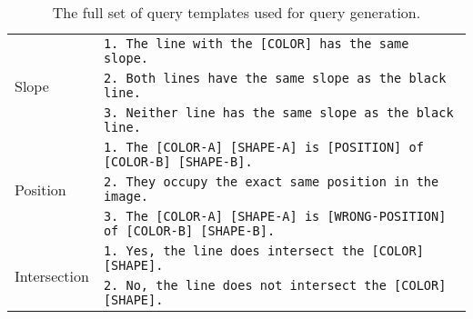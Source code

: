 \begin{table*}[b!]
{\begin{tabular}{ll}
        \midrule
        \multirow{3}{*}{Slope} & \texttt{1. The line with the [COLOR] has the same slope.} \\
        & \texttt{2. Both lines have the same slope as the black line.} \\
        & \texttt{3. Neither line has the same slope as the black line.}\\
        \midrule
        \multirow{3}{*}{Position} & \texttt{1. The [COLOR-A] [SHAPE-A] is [POSITION] of [COLOR-B] [SHAPE-B].} \\
        & \texttt{2. They occupy the exact same position in the image.} \\
        & \texttt{3. The [COLOR-A] [SHAPE-A] is [WRONG-POSITION] of [COLOR-B] [SHAPE-B].}\\
        \midrule
        \multirow{2}{*}{Intersection} & \texttt{1. Yes, the line does intersect the [COLOR] [SHAPE].} \\
        & \texttt{2. No, the line does not intersect the [COLOR] [SHAPE].} \\
        
        
        
        \bottomrule
    \end{tabular}
    }
    \vspace{-2mm}
    \caption{The full set of query templates used for query generation.}
\vspace{-3mm}
\label{tab:query_templates}
\end{table*}

